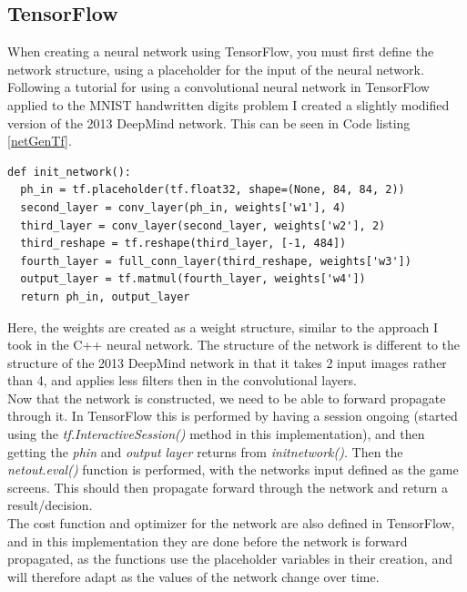 \documentclass[10pt]{article}
\begin{document}
	\subsection{TensorFlow}
		When creating a neural network using TensorFlow, you must first define the network structure, using a placeholder for the input of the neural network. Following a tutorial for using a convolutional neural network in TensorFlow applied to the MNIST handwritten digits problem \cite{tfTut} I created a slightly modified version of the 2013 DeepMind network. This can be seen in Code listing \ref{netGenTf}.
						\renewcommand{\lstlistingname}{Code Listing}
		\begin{lstlisting}[caption={Network generation in TensorFlow},label={netGenTf}]	
def init_network():
  ph_in = tf.placeholder(tf.float32, shape=(None, 84, 84, 2))
  second_layer = conv_layer(ph_in, weights['w1'], 4)
  third_layer = conv_layer(second_layer, weights['w2'], 2)
  third_reshape = tf.reshape(third_layer, [-1, 484])
  fourth_layer = full_conn_layer(third_reshape, weights['w3'])
  output_layer = tf.matmul(fourth_layer, weights['w4'])
  return ph_in, output_layer
		\end{lstlisting}
		
		Here, the weights are created as a weight structure, similar to the approach I took in the C++ neural network. The structure of the network is different to the structure of the 2013 DeepMind network in that it takes 2 input images rather than 4, and applies less filters then in the convolutional layers.\\
		
		Now that the network is constructed, we need to be able to forward propagate through it. In TensorFlow this is performed by having a session ongoing (started using the \textit{tf.InteractiveSession()} method in this implementation), and then getting the \textit{ph\textunderscore in} and \textit{output \textunderscore layer} returns from \textit{init\textunderscore network()}. Then the \textit{net\textunderscore out.eval()} function is performed, with the networks input defined as the game screens. This should then propagate forward through the network and return a result/decision.\\
		
		The cost function and optimizer for the network are also defined in TensorFlow, and in this implementation they are done before the network is forward propagated, as the functions use the placeholder variables in their creation, and will therefore adapt as the values of the network change over time.\\
		
\end{document}
